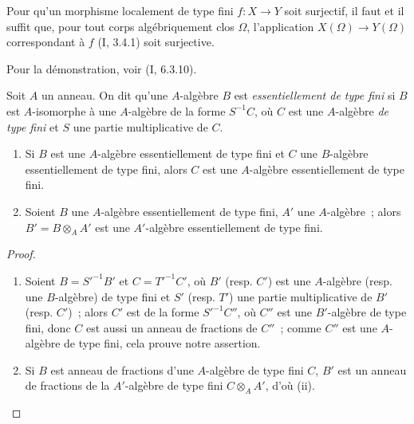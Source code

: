 \begin{proposition}[1.3.7]
\label{IV.1.3.7-fr}
Pour qu'un morphisme localement de type fini $f:X\to Y$ soit surjectif, il
faut et il suffit que, pour tout corps algébriquement clos $\Omega$,
l'application $X(\Omega)\to Y(\Omega)$ correspondant à $f$ (I, 3.4.1) soit
surjective.
\end{proposition}

Pour la démonstration, voir (I, 6.3.10).

\begin{env}[1.3.8]
\label{IV.1.3.8-fr}
Soit $A$ un anneau. On dit qu'une $A$-algèbre $B$ est \emph{essentiellement de
type fini} si $B$ est $A$-isomorphe à une $A$-algèbre de la forme $S^{-1}C$,
où $C$ est une $A$-algèbre \emph{de type fini} et $S$ une partie multiplicative
de $C$.
\end{env}

\par\medskip\noindent
\begin{proposition}[1.3.9]
\label{IV.1.3.9-fr}
\begin{enumerate}
  \item[(i)] Si $B$ est une $A$-algèbre essentiellement de type fini et $C$
  une $B$-algèbre essentiellement de type fini, alors $C$ est une
  $A$-algèbre essentiellement de type fini.
  \item[(ii)] Soient $B$ une $A$-algèbre essentiellement de type fini, $A'$
  une $A$-algèbre~; alors $B'=B\otimes_AA'$ est une $A'$-algèbre
  essentiellement de type fini.
\end{enumerate}
\end{proposition}

\begin{proof}
\begin{enumerate}
  \item[(i)] Soient $B=S'^{-1}B'$ et $C=T'^{-1}C'$, où $B'$ (resp. $C'$) est
  une $A$-algèbre (resp. une $B$-algèbre) de type fini et $S'$ (resp. $T'$)
  une partie multiplicative de $B'$ (resp. $C'$)~; alors $C'$ est de la forme
  $S'^{-1}C''$, où $C''$ est une $B'$-algèbre de type fini, donc $C$ est aussi
  un anneau de fractions de $C''$~; comme $C''$ est une $A$-algèbre de type
  fini, cela prouve notre assertion.
  \item[(ii)] Si $B$ est anneau de fractions d'une $A$-algèbre de type fini
  $C$, $B'$ est un anneau de fractions de la $A'$-algèbre de type fini
  $C\otimes_AA'$, d'où (ii).
\end{enumerate}
\end{proof}

